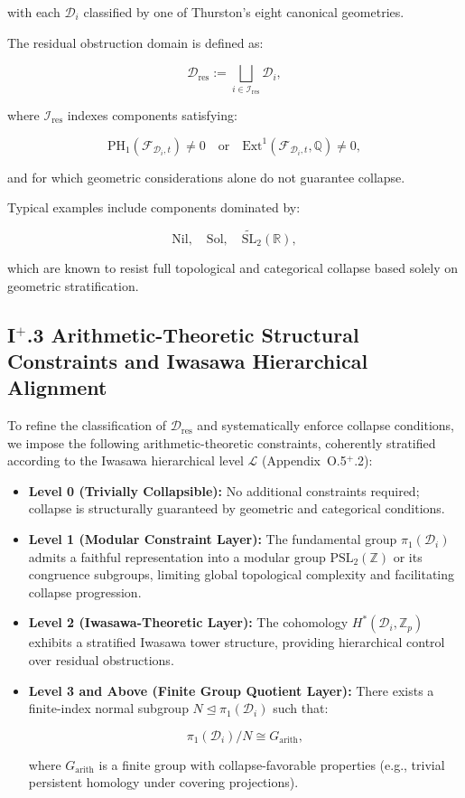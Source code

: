 \documentclass[11pt]{article}
\begin{document}
with each \( \mathcal{D}_i \) classified by one of Thurston's eight canonical geometries.

The residual obstruction domain is defined as:

\[
\mathcal{D}_{\mathrm{res}} := \bigsqcup_{i \in \mathcal{I}_{\mathrm{res}}} \mathcal{D}_i,
\]

where \( \mathcal{I}_{\mathrm{res}} \) indexes components satisfying:

\[
\mathrm{PH}_1(\mathcal{F}_{\mathcal{D}_i, t}) \neq 0 \quad \text{or} \quad \mathrm{Ext}^1(\mathcal{F}_{\mathcal{D}_i, t}, \mathbb{Q}) \neq 0,
\]

and for which geometric considerations alone do not guarantee collapse.

Typical examples include components dominated by:

\[
\mathrm{Nil},\quad \mathrm{Sol},\quad \widetilde{\mathrm{SL}}_2(\mathbb{R}),
\]

which are known to resist full topological and categorical collapse based solely on geometric stratification.

\subsection*{I$^{+}$.3 Arithmetic-Theoretic Structural Constraints and Iwasawa Hierarchical Alignment}

To refine the classification of \( \mathcal{D}_{\mathrm{res}} \) and systematically enforce collapse conditions, we impose the following arithmetic-theoretic constraints, coherently stratified according to the Iwasawa hierarchical level \( \mathcal{L} \) (Appendix~O.5$^{+}$.2):

\begin{itemize}
  \item \textbf{Level 0 (Trivially Collapsible):} No additional constraints required; collapse is structurally guaranteed by geometric and categorical conditions.
  
  \item \textbf{Level 1 (Modular Constraint Layer):} The fundamental group \( \pi_1(\mathcal{D}_i) \) admits a faithful representation into a modular group \( \mathrm{PSL}_2(\mathbb{Z}) \) or its congruence subgroups, limiting global topological complexity and facilitating collapse progression.
  
  \item \textbf{Level 2 (Iwasawa-Theoretic Layer):} The cohomology \( H^*(\mathcal{D}_i, \mathbb{Z}_p) \) exhibits a stratified Iwasawa tower structure, providing hierarchical control over residual obstructions.
  
  \item \textbf{Level 3 and Above (Finite Group Quotient Layer):} There exists a finite-index normal subgroup \( N \trianglelefteq \pi_1(\mathcal{D}_i) \) such that:

  \[
  \pi_1(\mathcal{D}_i) / N \cong G_{\mathrm{arith}},
  \]

  where \( G_{\mathrm{arith}} \) is a finite group with collapse-favorable properties (e.g., trivial persistent homology under covering projections).

\end{itemize}
\end{document}
